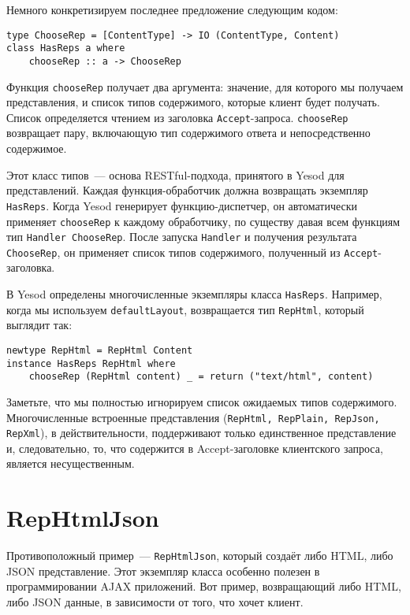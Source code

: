 Немного конкретизируем последнее предложение следующим кодом:

\begin{lstlisting}
type ChooseRep = [ContentType] -> IO (ContentType, Content)
class HasReps a where
    chooseRep :: a -> ChooseRep
\end{lstlisting}

Функция \lstinline'chooseRep' получает два аргумента: значение, для которого мы
получаем представления, и список типов содержимого, которые клиент будет
получать. Список определяется чтением из заголовка \verb*|Accept|-запроса.
\lstinline'chooseRep' возвращает пару, включающую тип содержимого ответа и
непосредственно содержимое.

Этот класс типов~--- основа RESTful-подхода, принятого в Yesod для
представлений. Каждая функция-обработчик должна возвращать экземпляр
\lstinline'HasReps'. Когда Yesod генерирует функцию-диспетчер, он автоматически
применяет \lstinline'chooseRep' к каждому обработчику, по существу давая всем
функциям тип \lstinline'Handler ChooseRep'. После  запуска \lstinline'Handler'
и получения результата \lstinline'ChooseRep',  он применяет список типов
содержимого, полученный из \verb*|Accept|-заголовка.

В Yesod определены многочисленные экземпляры класса \lstinline'HasReps'.
Например, когда мы используем \lstinline'defaultLayout', возвращается тип
\lstinline'RepHtml', который выглядит так:

\begin{lstlisting}
newtype RepHtml = RepHtml Content
instance HasReps RepHtml where
    chooseRep (RepHtml content) _ = return ("text/html", content)
\end{lstlisting}

Заметьте, что мы полностью игнорируем список ожидаемых типов содержимого.
Многочисленные встроенные представления
(\lstinline'RepHtml, RepPlain, RepJson, RepXml'), в действительности,
поддерживают только единственное представление и, следовательно, то, что
содержится в Accept-заголовке клиентского запроса, является несущественным.

\section{RepHtmlJson}

Противоположный пример~--- \lstinline'RepHtmlJson', который создаёт либо HTML,
либо JSON представление. Этот экземпляр класса особенно полезен в
программировании AJAX приложений.  Вот пример, возвращающий либо HTML, либо
JSON данные, в зависимости от того, что хочет клиент.

